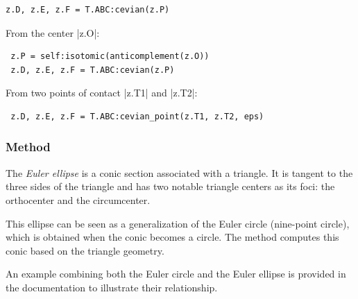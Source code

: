 \begin{mybox}
\begin{verbatim}
z.D, z.E, z.F = T.ABC:cevian(z.P)
\end{verbatim}
\end{mybox}

From the center |z.O|:

\begin{mybox}
\begin{verbatim}
 z.P = self:isotomic(anticomplement(z.O))
 z.D, z.E, z.F = T.ABC:cevian(z.P)
\end{verbatim}
\end{mybox}

From two points of contact |z.T1| and |z.T2|:

\begin{mybox}
\begin{verbatim}
 z.D, z.E, z.F = T.ABC:cevian_point(z.T1, z.T2, eps)
\end{verbatim}
\end{mybox}

\subsubsection{Method } %
\label{ssub:euler_ellipse}

The \emph{Euler ellipse} is a conic section associated with a triangle. It is tangent to the three sides of the triangle and has two notable triangle centers as its foci: the orthocenter and the circumcenter.

\medskip

This ellipse can be seen as a generalization of the Euler circle (nine-point circle), which is obtained when the conic becomes a circle. The method  computes this conic based on the triangle geometry.

\medskip

An example combining both the Euler circle and the Euler ellipse is provided in the documentation to illustrate their relationship.

\vspace{1em}


